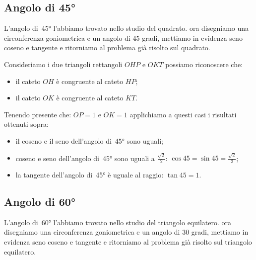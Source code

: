 \subsection{Angolo di 45°}

L'angolo di~45° l'abbiamo trovato nello studio del quadrato. ora 
disegniamo una circonferenza goniometrica e un angolo di 45 gradi, mettiamo 
in evidenza seno coseno e tangente e ritorniamo al problema già risolto sul 
quadrato.\\

 \begin{minipage}{.45\textwidth}
  \begin{center}
\begin{inaccessibleblock}
    
\end{inaccessibleblock}
  \end{center}
 \end{minipage}
 \begin{minipage}{.45\textwidth}
Consideriamo i due triangoli rettangoli \(OHP\) e \(OKT\) possiamo riconoscere 
che:
\begin{itemize} [noitemsep]
 \item il cateto \(OH\) è congruente al cateto \(HP\); 
 \item il cateto \(OK\) è congruente al cateto \(KT\).\\
\end{itemize}
 \end{minipage}
 
Tenendo presente che: \(OP=1\) e \(OK=1\) applichiamo a questi casi i risultati 
ottenuti sopra:
\begin{itemize} [noitemsep]
 \item il coseno e il seno dell'angolo di~45° sono uguali;
 \item coseno e seno dell'angolo di~45° sono uguali a \(\frac{\sqrt{2}}{2}\): 
  \(\cos 45 = \sin 45 = \frac{\sqrt{2}}{2}\); 
 \item la tangente dell'angolo di~45° è uguale al raggio: 
  \(\tan 45 = 1\).
\end{itemize}

\subsection{Angolo di 60°}

L'angolo di~60° l'abbiamo trovato nello studio del triangolo equilatero. ora 
disegniamo una circonferenza goniometrica e un angolo di 30 gradi, mettiamo 
in 
evidenza seno coseno e tangente e ritorniamo al problema già risolto sul 
triangolo equilatero.\\

